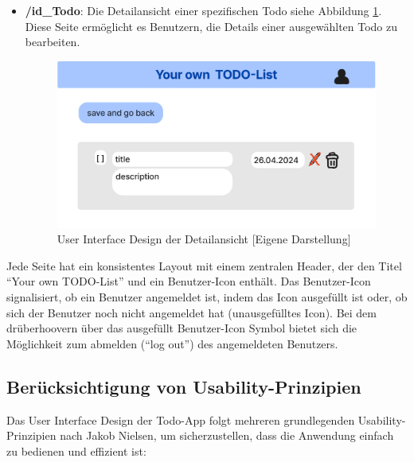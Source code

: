 \begin{itemize}
	\item \textbf{/{id\_Todo}}: Die Detailansicht einer spezifischen Todo siehe Abbildung \ref{UI_idTodo}. Diese Seite ermöglicht es Benutzern, die Details einer ausgewählten Todo zu bearbeiten.
	
	\begin{figure}[h]
		\centering
		\includegraphics[clip,width=0.75\linewidth]{images/idTodo.png}
		\caption[User Interface Design der Detailansicht]{User Interface Design der Detailansicht [Eigene Darstellung]}
		\label{UI_idTodo}
	\end{figure}	
	
\end{itemize}

Jede Seite hat ein konsistentes Layout mit einem zentralen Header, der den Titel "`Your own TODO-List"' und ein Benutzer-Icon enthält. Das Benutzer-Icon signalisiert, ob ein Benutzer angemeldet ist, indem das Icon ausgefüllt ist oder, ob sich der Benutzer noch nicht angemeldet hat (unausgefülltes Icon). Bei dem drüberhoovern über das ausgefüllt Benutzer-Icon Symbol bietet sich die Möglichkeit zum abmelden ("`log out"') des angemeldeten Benutzers. 

\subsection{Berücksichtigung von Usability-Prinzipien}

Das User Interface Design der Todo-App folgt mehreren grundlegenden Usability-Prinzipien nach Jakob Nielsen, um sicherzustellen, dass die Anwendung einfach zu bedienen und effizient ist:

